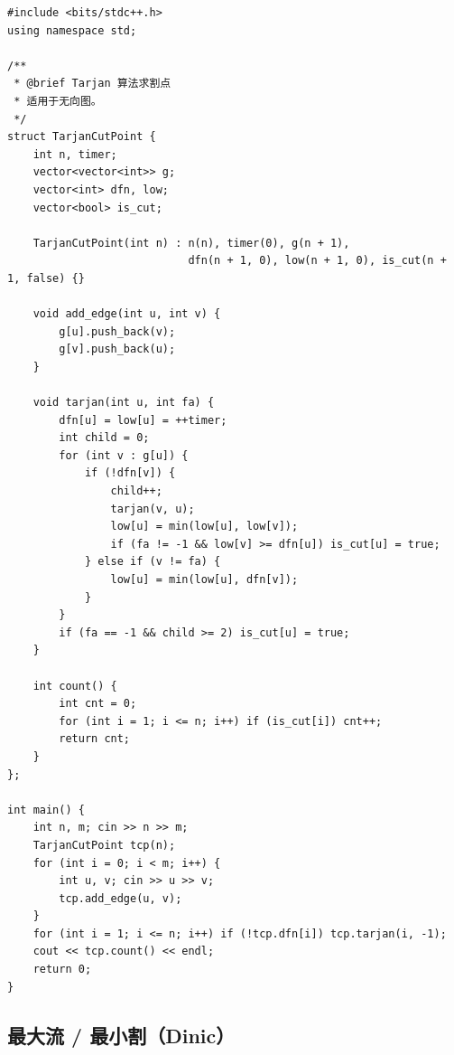 \begin{lstlisting}
#include <bits/stdc++.h>
using namespace std;

/**
 * @brief Tarjan 算法求割点
 * 适用于无向图。
 */
struct TarjanCutPoint {
    int n, timer;
    vector<vector<int>> g;
    vector<int> dfn, low;
    vector<bool> is_cut;

    TarjanCutPoint(int n) : n(n), timer(0), g(n + 1), 
                            dfn(n + 1, 0), low(n + 1, 0), is_cut(n + 1, false) {}

    void add_edge(int u, int v) {
        g[u].push_back(v);
        g[v].push_back(u);
    }

    void tarjan(int u, int fa) {
        dfn[u] = low[u] = ++timer;
        int child = 0;
        for (int v : g[u]) {
            if (!dfn[v]) {
                child++;
                tarjan(v, u);
                low[u] = min(low[u], low[v]);
                if (fa != -1 && low[v] >= dfn[u]) is_cut[u] = true;
            } else if (v != fa) {
                low[u] = min(low[u], dfn[v]);
            }
        }
        if (fa == -1 && child >= 2) is_cut[u] = true;
    }

    int count() {
        int cnt = 0;
        for (int i = 1; i <= n; i++) if (is_cut[i]) cnt++;
        return cnt;
    }
};

int main() {
    int n, m; cin >> n >> m;
    TarjanCutPoint tcp(n);
    for (int i = 0; i < m; i++) {
        int u, v; cin >> u >> v;
        tcp.add_edge(u, v);
    }
    for (int i = 1; i <= n; i++) if (!tcp.dfn[i]) tcp.tarjan(i, -1);
    cout << tcp.count() << endl;
    return 0;
}
\end{lstlisting}

\subsection{最大流 / 最小割（Dinic）}

